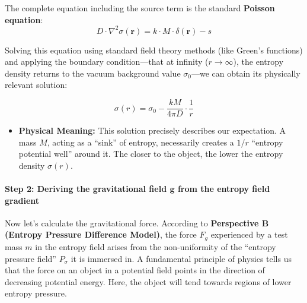 \documentclass[11pt, a4paper]{article}
\begin{document}
The complete equation including the source term is the standard \textbf{Poisson equation}:
\[
D \cdot \nabla^2\sigma(\mathbf{r}) = k \cdot M \cdot \delta(\mathbf{r}) - s
\]

Solving this equation using standard field theory methods (like Green's functions) and applying the boundary condition—that at infinity ($r\to\infty$), the entropy density returns to the vacuum background value $\sigma_0$—we can obtain its physically relevant solution:

\[
\sigma(r) = \sigma_0 - \frac{kM}{4\pi D} \cdot \frac{1}{r}
\]

\begin{itemize}
    \item \textbf{Physical Meaning:} This solution precisely describes our expectation. A mass $M$, acting as a ``sink'' of entropy, necessarily creates a $1/r$ ``entropy potential well'' around it. The closer to the object, the lower the entropy density $\sigma(r)$.
\end{itemize}

\paragraph{Step 2: Deriving the gravitational field $\mathbf{g}$ from the entropy field gradient}

Now let's calculate the gravitational force. According to \textbf{Perspective B (Entropy Pressure Difference Model)}, the force $F_g$ experienced by a test mass $m$ in the entropy field arises from the non-uniformity of the ``entropy pressure field'' $P_\sigma$ it is immersed in. A fundamental principle of physics tells us that the force on an object in a potential field points in the direction of decreasing potential energy. Here, the object will tend towards regions of lower entropy pressure.
\end{document}
